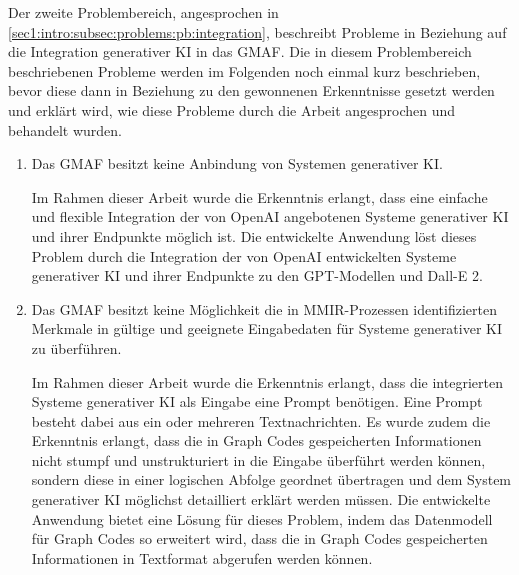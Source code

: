 Der zweite Problembereich, angesprochen in \cref{sec1:intro:subsec:problems:pb:integration}, beschreibt Probleme in Beziehung auf die Integration generativer KI in das GMAF.
Die in diesem Problembereich beschriebenen Probleme werden im Folgenden noch einmal kurz beschrieben, bevor diese dann in Beziehung zu den gewonnenen Erkenntnisse gesetzt werden und erklärt wird, wie diese Probleme durch die Arbeit angesprochen und behandelt wurden.
\begin{enumerate}
  \item Das GMAF besitzt keine Anbindung von Systemen generativer KI.

  Im Rahmen dieser Arbeit wurde die Erkenntnis erlangt, dass eine einfache und flexible Integration der von OpenAI angebotenen Systeme generativer KI und ihrer Endpunkte möglich ist.
  Die entwickelte Anwendung löst dieses Problem durch die Integration der von OpenAI entwickelten Systeme generativer KI und ihrer Endpunkte zu den GPT-Modellen und Dall-E 2.

  \item Das GMAF besitzt keine Möglichkeit die in MMIR-Prozessen identifizierten Merkmale in gültige und geeignete Eingabedaten für Systeme generativer KI zu überführen.

  Im Rahmen dieser Arbeit wurde die Erkenntnis erlangt, dass die integrierten Systeme generativer KI als Eingabe eine Prompt benötigen.
  Eine Prompt besteht dabei aus ein oder mehreren Textnachrichten.
  Es wurde zudem die Erkenntnis erlangt, dass die in Graph Codes gespeicherten Informationen nicht stumpf und unstrukturiert in die Eingabe überführt werden können, sondern diese in einer logischen Abfolge geordnet übertragen und dem System generativer KI möglichst detailliert erklärt werden müssen.
  Die entwickelte Anwendung bietet eine Lösung für dieses Problem, indem das Datenmodell für Graph Codes so erweitert wird, dass die in Graph Codes gespeicherten Informationen in Textformat abgerufen werden können.
\end{enumerate}

